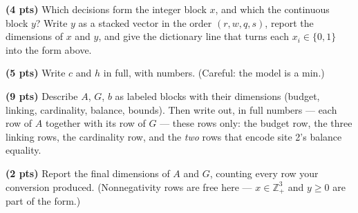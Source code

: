 \documentclass[10pt]{article}
\begin{document}
\begin{parts}
\item \textbf{(4 pts)} Which decisions form the integer block $x$, and which the
  continuous block $y$? Write $y$ as a stacked vector in the order $(r, w, q, s)$,
  report the dimensions of $x$ and $y$, and give the dictionary line that turns
  each $x_i \in \{0,1\}$ into the form above.
\item \textbf{(5 pts)} Write $c$ and $h$ in full, with numbers. (Careful: the model
  is a min.)
\item \textbf{(9 pts)} Describe $A$, $G$, $b$ as labeled blocks with their
  dimensions (budget, linking, cardinality, balance, bounds). Then write out, in
  full numbers --- each row of $A$ together with its row of $G$ --- these rows
  only: the budget row, the three linking rows, the cardinality row, and the
  \emph{two} rows that encode site 2's balance equality.
\item \textbf{(2 pts)} Report the final dimensions of $A$ and $G$, counting every
  row your conversion produced. (Nonnegativity rows are free here ---
  $x \in \mathbb{Z}^{3}_{+}$ and $y \ge 0$ are part of the form.)
\end{parts}
\end{document}
